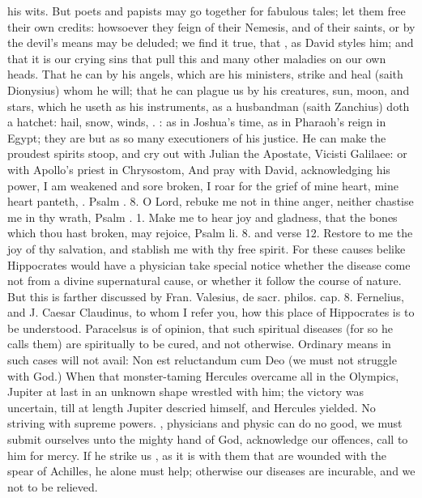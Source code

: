 {{his wits. But poets and papists may go together for fabulous tales; let
them free their own credits: howsoever they feign of their Nemesis, and
of their saints, or by the devil's means may be deluded; we find it
true, that , as David
styles him; and that it is our crying sins that pull this and many
other maladies on our own heads. That he can by his angels, which are
his ministers, strike and heal (saith Dionysius) whom he will;
that he can plague us by his creatures, sun, moon, and stars, which he
useth as his instruments, as a husbandman (saith Zanchius) doth a
hatchet: hail, snow, winds, \etc{}. : as in Joshua's time, as in Pharaoh's reign in Egypt; they are
but as so many executioners of his justice. He can make the proudest
spirits stoop, and cry out with Julian the Apostate, Vicisti Galilaee:
or with Apollo's priest in Chrysostom,  And pray with David, acknowledging
his power, I am weakened and sore broken, I roar for the grief of mine
heart, mine heart panteth, \etc{}. Psalm . 8. O Lord, rebuke me not
in thine anger, neither chastise me in thy wrath, Psalm . 1.
Make me to hear joy and gladness, that the bones which thou hast
broken, may rejoice, Psalm li. 8. and verse 12. Restore to me the joy
of thy salvation, and stablish me with thy free spirit. For these
causes belike Hippocrates would have a physician take special
notice whether the disease come not from a divine supernatural cause,
or whether it follow the course of nature. But this is farther
discussed by Fran. Valesius, de sacr. philos. cap. 8.  Fernelius,
and J. Caesar Claudinus, to whom I refer you, how this place of
Hippocrates is to be understood. Paracelsus is of opinion, that such
spiritual diseases (for so he calls them) are spiritually to be cured,
and not otherwise. Ordinary means in such cases will not avail: Non est
reluctandum cum Deo (we must not struggle with God.) When that
monster-taming Hercules overcame all in the Olympics, Jupiter at last
in an unknown shape wrestled with him; the victory was uncertain, till
at length Jupiter descried himself, and Hercules yielded. No striving
with supreme powers. ,
physicians and physic can do no good, we must submit ourselves
unto the mighty hand of God, acknowledge our offences, call to him for
mercy. If he strike us , as it
is with them that are wounded with the spear of Achilles, he alone must
help; otherwise our diseases are incurable, and we not to be relieved.

}}
